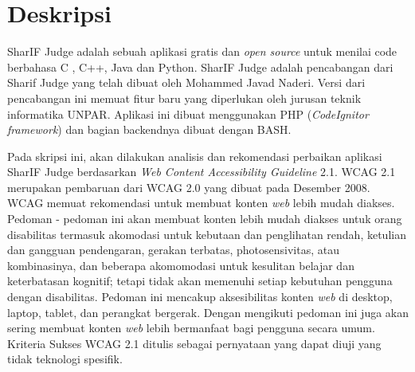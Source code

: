 \documentclass[a4paper,twoside]{article}
\begin{document}
\title{\@judultopik}
\author{\nama \textendash \@npm} 

\newcommand{\nama}{Amabel Levint}
\newcommand{\@npm}{2016730013}
\newcommand{\@judultopik}{Kepatuhan dan Rekomendasi Perbaikan Web Content Accessibility Guideline 2.1 untuk Aplikasi SharIF Judge} %
\newcommand{\jumpemb}{1} %
\newcommand{\tanggal}{23/08/2019}


\maketitle


\section{Deskripsi}
SharIF Judge adalah sebuah aplikasi gratis dan \textit{open source} untuk menilai code berbahasa C , C++, Java dan Python. SharIF Judge adalah pencabangan dari Sharif Judge yang telah dibuat oleh Mohammed Javad Naderi. Versi dari pencabangan ini memuat fitur baru yang diperlukan oleh jurusan teknik informatika UNPAR. Aplikasi ini dibuat menggunakan PHP (\textit{CodeIgnitor framework}) dan bagian backendnya dibuat dengan BASH.

Pada skripsi ini, akan dilakukan analisis dan rekomendasi perbaikan aplikasi SharIF Judge berdasarkan \textit{Web Content Accessibility Guideline} 2.1. WCAG 2.1 merupakan pembaruan dari WCAG 2.0 yang dibuat pada Desember 2008. WCAG memuat rekomendasi untuk membuat konten \textit{web} lebih mudah diakses. Pedoman - pedoman ini akan membuat konten lebih mudah diakses untuk orang disabilitas termasuk akomodasi untuk kebutaan dan penglihatan rendah, ketulian dan gangguan pendengaran, gerakan terbatas, photosensivitas, atau kombinasinya, dan beberapa akomomodasi untuk kesulitan belajar dan keterbatasan kognitif; tetapi tidak akan memenuhi setiap kebutuhan pengguna dengan disabilitas. Pedoman ini mencakup aksesibilitas konten \textit{web} di desktop, laptop, tablet, dan perangkat bergerak. Dengan mengikuti pedoman ini juga akan sering membuat konten \textit{web} lebih bermanfaat bagi pengguna secara umum. Kriteria Sukses WCAG 2.1 ditulis sebagai pernyataan yang dapat diuji yang tidak teknologi spesifik.
\end{document}

